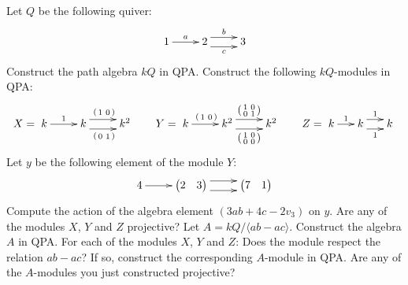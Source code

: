 \documentclass[a4paper]{amsart}
\newcommand{\VV}[2]{\begin{pmatrix} #1 & #2 \end{pmatrix}}
\newcommand{\vv}[2]{\left( \begin{smallmatrix} #1 & #2 \end{smallmatrix} \right)}
\begin{document}
\begin{Exercise}[title={Modules}]
Let $Q$ be the following quiver:
\[
\xymatrix{
1 \ar[r]^a &
2 \ar@<1ex>[r]^b \ar@<-1ex>[r]_c &
3
}
\]
\Question Construct the path algebra $kQ$ in QPA.
\Question Construct the following $kQ$-modules in QPA:
\[
X =
\xymatrix{
k \ar[r]^1 &
k \ar@<1ex>[r]^{\vv{1}{0}}
  \ar@<-1ex>[r]_{\vv{0}{1}} &
k^2
}
\qquad
Y =
\xymatrix{
k \ar[r]^{\vv{1}{0}} &
k^2 \ar@<1ex>[r]^{\left(\begin{smallmatrix} 1&0 \\ 0&1 \end{smallmatrix}\right)}
    \ar@<-1ex>[r]_{\left(\begin{smallmatrix} 1&0 \\ 0&0 \end{smallmatrix}\right)} &
k^2
}
\qquad
Z =
\xymatrix@C=1.5em{
k \ar[r]^1 &
k \ar@<1ex>[r]^{1}
  \ar@<-1ex>[r]_{1} &
k
}
\]
\Question Let $y$ be the following element of the module $Y$:
\[
\xymatrix{
4 \ar[r] &
{\VV{2}{3}} \ar@<1ex>[r] \ar@<-1ex>[r] &
{\VV{7}{1}}
}
\]
Compute the action of the algebra element $(3ab + 4c - 2v_3)$ on $y$.
\Question Are any of the modules $X$, $Y$ and $Z$ projective?
\Question Let $A = kQ/\langle ab - ac \rangle$.  Construct the algebra
$A$ in QPA.
\Question For each of the modules $X$, $Y$ and $Z$: Does the module
respect the relation $ab - ac$?  If so, construct the corresponding
$A$-module in QPA.
\Question Are any of the $A$-modules you just constructed projective?
\end{Exercise}




\end{document}
